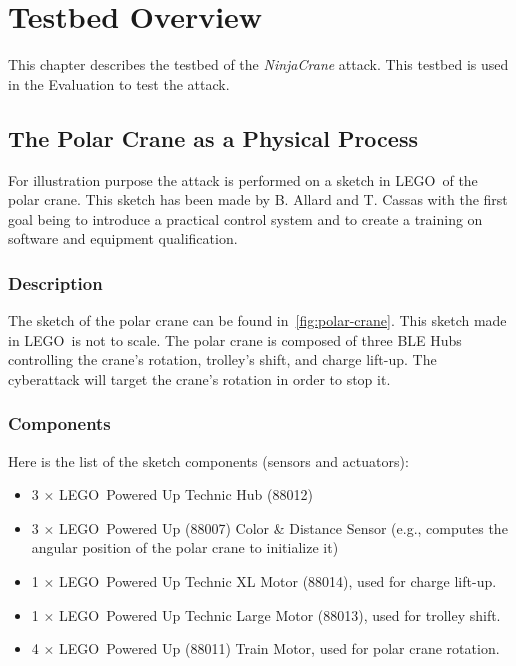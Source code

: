 \chapter{Testbed Overview}

This chapter describes the testbed of the \emph{NinjaCrane} attack. This testbed is used in the Evaluation  to test the attack.  

\section{The Polar Crane as a Physical Process}

For illustration purpose the attack is performed on a sketch in LEGO\texttrademark\ of the polar crane. This sketch has been made by B. Allard and T. Cassas with the first goal being to introduce a practical control system and to create a training on software and equipment qualification. 

\subsection{Description}

The sketch of the polar crane can be found in~\autoref{fig:polar-crane}. This sketch made in LEGO\texttrademark\ is not to scale. The polar crane is composed of three BLE Hubs controlling the crane's rotation, trolley's shift, and charge lift-up. The cyberattack will target the crane's rotation in order to stop it.   

\subsection{Components}

Here is the list of the sketch components (sensors and actuators):

\begin{itemize}
    \item 3 $\times$ LEGO\texttrademark\ Powered Up Technic Hub (88012)
    \item 3 $\times$ LEGO\texttrademark\ Powered Up (88007) Color \& Distance Sensor (e.g., computes the angular position of the polar crane to initialize it)
    \item 1 $\times$ LEGO\texttrademark\ Powered Up Technic XL Motor (88014), used for charge lift-up.
    \item 1 $\times$ LEGO\texttrademark\ Powered Up Technic Large Motor (88013), used for trolley shift.
    \item 4 $\times$ LEGO\texttrademark\ Powered Up (88011) Train Motor, used for polar crane rotation.
\end{itemize}

